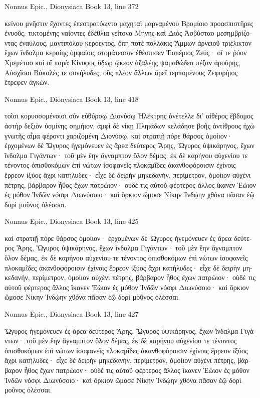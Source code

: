 \documentclass[12pt,letterpaper,twoside,final]{memoir}
\begin{document}
\begin{greek}
Nonnus Epic., Dionysiaca 
Book 13, line 372

κείνου μνῆστιν ἔχοντες ἐπεστρατόωντο μαχηταὶ 
μαρναμένου Βρομίοιο προασπιστῆρες ἐνυοῦς, 
τικτομένης ναίοντες ἐδέθλια γείτονα Μήνης 
καὶ Διὸς Ἀσβύσταο μεσημβρίζοντας ἐναύλους, 
μαντιπόλου κερόεντος, ὅπῃ ποτὲ πολλάκις Ἄμμων 
ἀρνειοῦ τριέλικτον ἔχων ἴνδαλμα κεραίης 
ὀμφαίοις στομάτεσσιν ἐθέσπισεν Ἑσπέριος Ζεύς· 
οἵ τε ῥόον Χρεμέταο καὶ οἳ παρὰ Κίνυφος ὕδωρ 
ᾤκεον ἀζαλέης ψαμαθώδεα πέζαν ἀρούρης, 
Αὐσχῖσαι Βάκαλές τε συνήλυδες, οὓς πλέον ἄλλων 
ἄρεϊ τερπομένους Ζεφυρήιος ἔτρεφεν ἀγκών. 



Nonnus Epic., Dionysiaca 
Book 13, line 418

τοῖσι κορυσσομένοισι σὺν εὐθύρσῳ Διονύσῳ 
Ἠλέκτρης ἀνέτελλε δι' αἰθέρος ἕβδομος ἀστὴρ 
δεξιὸν ὑσμίνης σημήιον, ἀμφὶ δὲ νίκῃ 
Πληιάδων κελάδησε βοῆς ἀντίθροος ἠχὼ 
γνωτῆς αἷμα φέροντι χαριζομένη Διονύσῳ, 
καὶ στρατιῇ πόρε θάρσος ὁμοίιον· ἐρχομένων δὲ 
Ὤγυρος ἡγεμόνευεν ἐς ἄρεα δεύτερος Ἄρης, 
Ὤγυρος ὑψικάρηνος, ἔχων ἴνδαλμα Γιγάντων· 
τοῦ μὲν ἔην ἄγναμπτον ὅλον δέμας, ἐκ δὲ καρήνου 
αὐχενίου τε τένοντος ὀπισθοκόμων ἐπὶ νώτων 
ἰσοφανεῖς πλοκαμῖδες ἀκανθοφόροισιν ἐχίνοις 
ἔρρεον ἰξύος ἄχρι κατήλυδες· εἶχε δὲ δειρὴν 
μηκεδανήν, περίμετρον, ὁμοίιον αὐχένι πέτρης, 
βάρβαρον ἦθος ἔχων πατρώιον· οὐδέ τις αὐτοῦ   
φέρτερος ἄλλος ἵκανεν Ἑώιον ἐς μόθον Ἰνδῶν 
νόσφι Διωνύσοιο· καὶ ὅρκιον ὤμοσε Νίκην 
Ἰνδῴην χθόνα πᾶσαν ἑῷ δορὶ μοῦνος ὀλέσσαι. 



Nonnus Epic., Dionysiaca 
Book 13, line 425

καὶ στρατιῇ πόρε θάρσος ὁμοίιον· ἐρχομένων δὲ 
Ὤγυρος ἡγεμόνευεν ἐς ἄρεα δεύτερος Ἄρης, 
Ὤγυρος ὑψικάρηνος, ἔχων ἴνδαλμα Γιγάντων· 
τοῦ μὲν ἔην ἄγναμπτον ὅλον δέμας, ἐκ δὲ καρήνου 
αὐχενίου τε τένοντος ὀπισθοκόμων ἐπὶ νώτων 
ἰσοφανεῖς πλοκαμῖδες ἀκανθοφόροισιν ἐχίνοις 
ἔρρεον ἰξύος ἄχρι κατήλυδες· εἶχε δὲ δειρὴν 
μηκεδανήν, περίμετρον, ὁμοίιον αὐχένι πέτρης, 
βάρβαρον ἦθος ἔχων πατρώιον· οὐδέ τις αὐτοῦ   
φέρτερος ἄλλος ἵκανεν Ἑώιον ἐς μόθον Ἰνδῶν 
νόσφι Διωνύσοιο· καὶ ὅρκιον ὤμοσε Νίκην 
Ἰνδῴην χθόνα πᾶσαν ἑῷ δορὶ μοῦνος ὀλέσσαι. 



Nonnus Epic., Dionysiaca 
Book 13, line 427

Ὤγυρος ἡγεμόνευεν ἐς ἄρεα δεύτερος Ἄρης, 
Ὤγυρος ὑψικάρηνος, ἔχων ἴνδαλμα Γιγάντων· 
τοῦ μὲν ἔην ἄγναμπτον ὅλον δέμας, ἐκ δὲ καρήνου 
αὐχενίου τε τένοντος ὀπισθοκόμων ἐπὶ νώτων 
ἰσοφανεῖς πλοκαμῖδες ἀκανθοφόροισιν ἐχίνοις 
ἔρρεον ἰξύος ἄχρι κατήλυδες· εἶχε δὲ δειρὴν 
μηκεδανήν, περίμετρον, ὁμοίιον αὐχένι πέτρης, 
βάρβαρον ἦθος ἔχων πατρώιον· οὐδέ τις αὐτοῦ   
φέρτερος ἄλλος ἵκανεν Ἑώιον ἐς μόθον Ἰνδῶν 
νόσφι Διωνύσοιο· καὶ ὅρκιον ὤμοσε Νίκην 
Ἰνδῴην χθόνα πᾶσαν ἑῷ δορὶ μοῦνος ὀλέσσαι. 




\end{greek}
\end{document}
